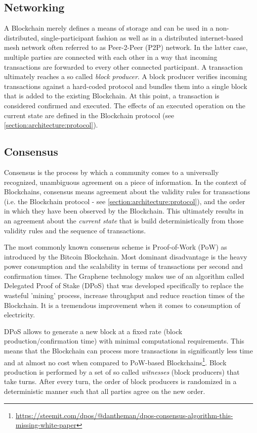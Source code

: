 \subsection{ Networking }
\label{section:architecture:networking}

A Blockchain merely defines a means of storage and can be used in a non-distributed, single-participant fashion as well as in a distributed internet-based mesh network often referred to as Peer-2-Peer (P2P) network. In the latter case, multiple parties are connected with each other in a way that incoming transactions are forwarded to every other connected participant. A transaction ultimately reaches a so called \emph{block producer}. A block producer verifies incoming transactions against a hard-coded protocol and bundles them into a single block that is added to the existing Blockchain. At this point, a transaction is considered confirmed and executed. The effects of an executed operation on the current state are defined in the Blockchain protocol  (see \cref{section:architecture:protocol}).

\subsection{ Consensus }
Consensus is the process by which a community comes to a universally recognized, unambiguous agreement on a piece of information. In the context of Blockchains, consensus means agreement about the validity rules for transactions (i.e. the Blockchain protocol - see \cref{section:architecture:protocol}), and the order in which they have been observed by the Blockchain. This ultimately results in an agreement about the \emph{current state} that is build deterministically from those validity rules and the sequence of transactions.

The most commonly known consensus scheme is Proof-of-Work (PoW) as introduced by the Bitcoin Blockchain. Most dominant disadvantage is the heavy power consumption and the scalability in terms of transactions per second and confirmation times. The Graphene technology makes use of an algorithm called Delegated Proof of Stake (DPoS) that was developed specifically to replace the wasteful 'mining' process, increase throughput and reduce reaction times of the Blockchain. It is a tremendous improvement when it comes to consumption of electricity.

DPoS allows to generate a new block at a fixed rate (block production/confirmation time) with minimal computational requirements. This means that the Blockchain can process more transactions in significantly less time and at almost no cost when compared to PoW-based Blockchains\footnote{\url{https://steemit.com/dpos/@dantheman/dpos-consensus-algorithm-this-missing-white-paper}}. Block production is performed by a set of so called \emph{witnesses} (block producers) that take turns. After every turn, the order of block producers is randomized in a deterministic manner such that all parties agree on the new order.


